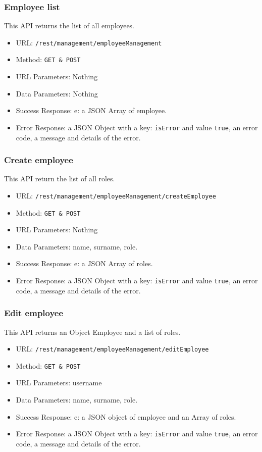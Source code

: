 \subsubsection*{Employee list}
This API returns the list of all employees. 

\begin{itemize}
    \item URL: \texttt{/rest/management/employeeManagement}
    \item Method: \texttt{{GET \& POST}}
    \item URL Parameters: Nothing
    \item Data Parameters: Nothing
    \item Success Response: e: a JSON Array of employee.
    \item Error Response: a JSON Object with a key: \texttt{isError}  and value \texttt{true}, an error code, a message and details of the error.
\end{itemize}

\subsubsection*{Create employee}
This API return the list of all roles.

\begin{itemize}
    \item URL: \texttt{/rest/management/employeeManagement/createEmployee}
    \item Method: \texttt{{GET \& POST}}
    \item URL Parameters: Nothing
    \item Data Parameters: name, surname, role.
    \item Success Response: e: a JSON Array of roles.
    \item Error Response: a JSON Object with a key: \texttt{isError}  and value \texttt{true}, an error code, a message and details of the error.
\end{itemize}

\subsubsection*{Edit employee}
This API returns an Object Employee and a list of roles.
\begin{itemize}
    \item URL: \texttt{/rest/management/employeeManagement/editEmployee}
    \item Method: \texttt{{GET \& POST}}
    \item URL Parameters: username
    \item Data Parameters: name, surname, role.
    \item Success Response: e: a JSON object of employee and an Array of roles.
    \item Error Response: a JSON Object with a key: \texttt{isError}  and value \texttt{true}, an error code, a message and details of the error.
\end{itemize}

